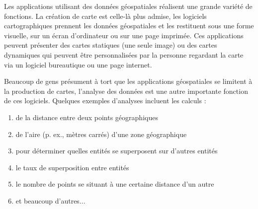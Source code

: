 Les applications utilisant des données géospatiales réalisent une grande variété de fonctions. La création de carte est celle-là plus admise, les logiciels cartographiques prennent les données géospatiales et les restituent sous une forme visuelle, sur un écran d'ordinateur ou sur une page imprimée.
Ces applications peuvent présenter des cartes statiques (une seule image) ou des cartes dynamiques qui peuvent être personnalisées par la personne regardant la carte via un logiciel bureautique ou une page internet.

Beaucoup de gens présument à tort que les applications géospatiales se limitent à la production de cartes, l'analyse des données est une autre importante fonction de ces logiciels. Quelques exemples d'analyses incluent les calculs : 


\begin{enumerate} 
\item de la distance entre deux points géographiques  
\item de l'aire (p. ex., mètres carrés) d'une zone géographique 
\item pour déterminer quelles entités se superposent sur d'autres entités 
\item le taux de superposition entre entités 
\item le nombre de points se situant à une certaine distance d'un autre 
\item et beaucoup d'autres...
\end{enumerate} 

%


